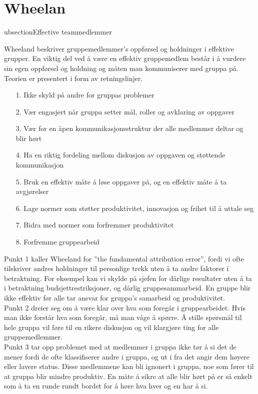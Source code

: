 \section{Wheelan}
ubsection{Effective teammedlemmer}

Wheeland beskriver gruppemedlemmer's oppførsel og holdninger i effektive grupper. En viktig del ved å være en effektiv gruppemedlem består i å vurdere sin egen oppførsel og holdning og måten man kommuniserer med gruppa på. Teorien er presentert i form av retningslinjer. 

\begin{itemize}
\item[1.] Ikke skyld på andre for gruppas problemer
\item[2.] Vær engasjert når gruppa setter mål, roller og avklaring av oppgaver
\item[3.] Vær for en åpen kommunikasjonsstruktur der alle medlemmer deltar og blir hørt 
\item[4.] Ha en riktig fordeling mellom diskusjon av oppgaven og støttende kommunikasjon
\item[5.] Bruk en effektiv måte å løse oppgaver på, og en effektiv måte å ta avgjørelser
\item[6.] Lage normer som støtter produktivitet, innovasjon og frihet til å uttale seg
\item[7.] Bidra med normer som forfremmer produktivitet
\item[8.] Forfremme gruppearbeid
\end{itemize}

Punkt 1 kaller Wheeland for ''the fundamental attribution error'', fordi vi ofte tilskriver andres holdninger til personlige trekk uten å ta andre faktorer i betraktning. For eksempel kan vi skylde på sjefen for dårlige resultater uten å ta i betraktning budsjettrestriksjoner, og dårlig gruppesammarbeid. En gruppe blir ikke effektiv før alle tar ansvar for gruppa's samarbeid og produktivitet. \\

Punkt 2 dreier seg om å være klar over hva som foregår i gruppearbeidet. Hvis man ikke forstår hva som foregår, må man våge å spørre. Å stille spørsmål til hele gruppa vil føre til en rikere diskusjon og vil klargjøre ting for alle gruppemedlemmer. \\

Punkt 3 tar opp problemet med at medlemmer i gruppa ikke tør å si det de mener fordi de ofte klassifiserer andre i gruppa, og ut i fra det angir dem høyere eller lavere status. Disse medlemmene kan bli ignonert i gruppa, noe som fører til at gruppa blir mindre produktiv. En måte å sikre at alle blir hørt på er så enkelt som å ta en runde rundt bordet for å høre hva hver og en har å si. \\

